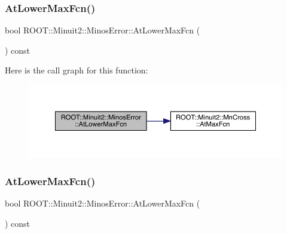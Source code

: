 \subsubsection{\texorpdfstring{AtLowerMaxFcn()}{AtLowerMaxFcn()}\hspace{0.1cm}{\footnotesize\ttfamily [1/3]}}
{\footnotesize\ttfamily bool R\+O\+O\+T\+::\+Minuit2\+::\+Minos\+Error\+::\+At\+Lower\+Max\+Fcn (\begin{DoxyParamCaption}{ }\end{DoxyParamCaption}) const\hspace{0.3cm}{\ttfamily [inline]}}

Here is the call graph for this function\+:
\nopagebreak
\begin{figure}[H]
\begin{center}
\leavevmode
\includegraphics[width=350pt]{d2/dd1/classROOT_1_1Minuit2_1_1MinosError_a6ec22eac3b7dd1a281f1df710ed1dc74_cgraph}
\end{center}
\end{figure}
\mbox{\label{classROOT_1_1Minuit2_1_1MinosError_a6ec22eac3b7dd1a281f1df710ed1dc74}} 
\subsubsection{\texorpdfstring{AtLowerMaxFcn()}{AtLowerMaxFcn()}\hspace{0.1cm}{\footnotesize\ttfamily [2/3]}}
{\footnotesize\ttfamily bool R\+O\+O\+T\+::\+Minuit2\+::\+Minos\+Error\+::\+At\+Lower\+Max\+Fcn (\begin{DoxyParamCaption}{ }\end{DoxyParamCaption}) const\hspace{0.3cm}{\ttfamily [inline]}}

